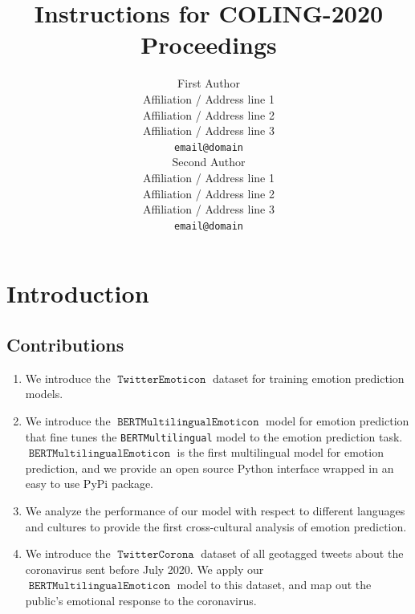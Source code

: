 \documentclass[11pt]{article}
\title{Instructions for COLING-2020 Proceedings}
\author{First Author \\
  Affiliation / Address line 1 \\
  Affiliation / Address line 2 \\
  Affiliation / Address line 3 \\
  {\tt email@domain} \\\And
  Second Author \\
  Affiliation / Address line 1 \\
  Affiliation / Address line 2 \\
  Affiliation / Address line 3 \\
  {\tt email@domain} \\}
\date{}
\DeclareMathOperator{\model}{\texttt{BERTMultilingualEmoticon}}
\DeclareMathOperator{\emoticon}{\texttt{TwitterEmoticon}}
\DeclareMathOperator{\corona}{\texttt{TwitterCorona}}
\begin{document}
\maketitle
\begin{abstract}
\end{abstract}

%
% 

\section{Introduction}
\label{sec:intro}

\subsection{Contributions}

\begin{enumerate}
    \item 
        We introduce the $\emoticon$ dataset for training emotion prediction models.
    \item
        We introduce the $\model$ model for emotion prediction that fine tunes the \texttt{BERTMultilingual} model \citep{fixme} to the emotion prediction task. 
        $\model$ is the first multilingual model for emotion prediction,
        and we provide an open source Python interface wrapped in an easy to use PyPi package.
    \item
        We analyze the performance of our model with respect to different languages and cultures to provide the first cross-cultural analysis of emotion prediction.
    \item 
        We introduce the $\corona$ dataset of all geotagged tweets about the coronavirus sent before July 2020.
        We apply our $\model$ model to this dataset,
        and map out the public's emotional response to the coronavirus.
\end{enumerate}
\end{document}
